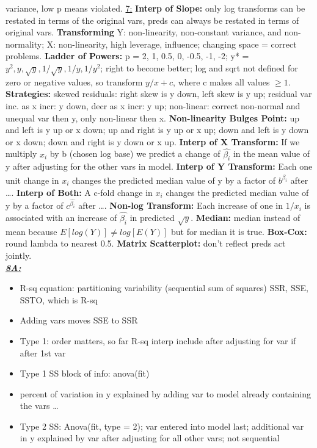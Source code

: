 \documentclass[8pt]{extarticle}
\begin{document}
variance, low p means violated.
\underline{7:}
\textbf{Interp of Slope:} only log transforms can be restated in terms of the 
original vars, preds can always be restated in terms of original vars.
\textbf{Transforming} Y: non-linearity, non-constant variance, and non-normality; 
X: non-linearity, high leverage, influence; changing space = correct problems.
\textbf{Ladder of Powers:} p = 2, 1, 0.5, 0, -0.5, -1, -2; y* = $y^2, y,
\sqrt{y}, 1/\sqrt{y}, 1/y, 1/y^2$; right to become better; log and sqrt not
defined for zero or negative values, so transform $y/x + c$, where c makes all 
values $\geq 1$.
\textbf{Strategies:} skewed residuals: right skew is y down, left skew is y up;
residual var inc. as x incr: y down, decr as x incr: y up; non-linear: correct 
non-normal and unequal var then y, only non-linear then x.
\textbf{Non-linearity Bulges Point:} up and left is y up or x down; up and 
right is y up or x up; down and left is y down or x down; down and right is y 
down or x up.
\textbf{Interp of X Transform:} If we multiply $x_i$ by b (chosen log base) we 
predict a change of $\hat{\beta_i}$ in the mean value of y after adjusting for 
the other vars in model.
\textbf{Interp of Y Transform:} Each one unit change in $x_i$ changes the 
predicted median value of y by a factor of $b^{\hat{\beta_i}}$ after \dots.
\textbf{Interp of Both:} A c-fold change in $x_i$ changes the predicted median 
value of y by a factor of $c^{\hat{\beta_i}}$ after \dots.
\textbf{Non-log Transform:} Each increase of one in $1/x_i$ is associated with 
an increase of $\hat{\beta_i}$ in predicted $\sqrt{y}$.
\textbf{Median:} median instead of mean because $E[log(Y)] \neq log[E(Y)]$ but 
for median it is true.
\textbf{Box-Cox:} round lambda to nearest 0.5.
\textbf{Matrix Scatterplot:} don't reflect preds act jointly.
\\

\textit{\textbf{\underline{8A:}}}
\begin{itemize}
    \item R-sq equation: partitioning variability (sequential sum of squares)
    SSR, SSE, SSTO, which is R-sq
    \item Adding vars moves SSE to SSR
    \item Type 1: order matters, so far R-sq interp include after adjusting for
    var if after 1st var
    \item Type 1 SS block of info: anova(fit)
    \item percent of variation in y explained by adding var to model already 
    containing the vars \dots
    \item Type 2 SS: Anova(fit, type = 2); var entered into model last; 
    additional var in y explained by var after adjusting for all other vars;
    not sequential
\end{itemize}
\end{document}
